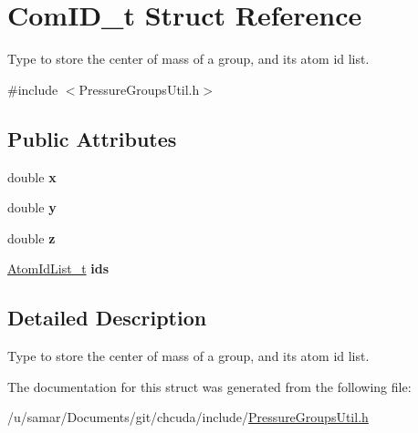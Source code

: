 \hypertarget{structComID__t}{}\section{Com\+I\+D\+\_\+t Struct Reference}
\label{structComID__t}


Type to store the center of mass of a group, and its atom id list.  




{\ttfamily \#include $<$Pressure\+Groups\+Util.\+h$>$}

\subsection*{Public Attributes}
\begin{DoxyCompactItemize}
\item 
\hypertarget{structComID__t_a0182278ffa94d5c3908294ff14de38a8}{}\label{structComID__t_a0182278ffa94d5c3908294ff14de38a8} 
double {\bfseries x}
\item 
\hypertarget{structComID__t_ad687a110816ef9ba19c0815efdddc1af}{}\label{structComID__t_ad687a110816ef9ba19c0815efdddc1af} 
double {\bfseries y}
\item 
\hypertarget{structComID__t_a2a8ecf7f1ef7426d03b2d86b04d4460f}{}\label{structComID__t_a2a8ecf7f1ef7426d03b2d86b04d4460f} 
double {\bfseries z}
\item 
\hypertarget{structComID__t_a3c76efb75b463401889de8dcee6eb3e5}{}\label{structComID__t_a3c76efb75b463401889de8dcee6eb3e5} 
\hyperlink{structAtomIdList__t}{Atom\+Id\+List\+\_\+t} {\bfseries ids}
\end{DoxyCompactItemize}


\subsection{Detailed Description}
Type to store the center of mass of a group, and its atom id list. 

The documentation for this struct was generated from the following file\+:\begin{DoxyCompactItemize}
\item 
/u/samar/\+Documents/git/chcuda/include/\hyperlink{PressureGroupsUtil_8h}{Pressure\+Groups\+Util.\+h}\end{DoxyCompactItemize}
